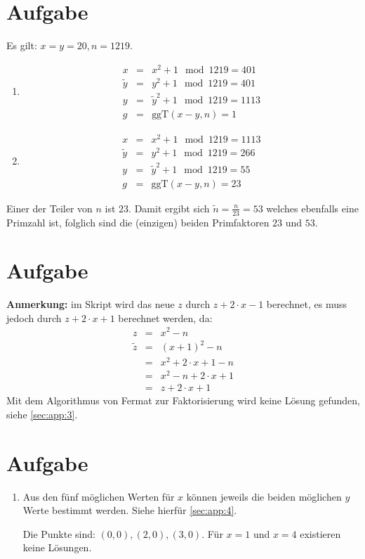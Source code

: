\documentclass[DIN, pagenumber=false, fontsize=11pt, parskip=half]{scrartcl}
\begin{document}
    \section{Aufgabe}
    Es gilt: $x = y = 20, n=1219$.
    \begin{enumerate}
        \item 
            \begin{eqnarray}
                x &=& x^2 + 1 \mod 1219 = 401 \\
                \tilde{y} &=& y^2 + 1 \mod 1219 = 401 \\
                y &=& \tilde{y}^2 + 1 \mod 1219 = 1113 \\
                g &=& \text{ggT}(x-y, n) = 1
            \end{eqnarray}
        \item 
            \begin{eqnarray}
                x &=& x^2 + 1 \mod 1219 = 1113 \\
                \tilde{y} &=& y^2 + 1 \mod 1219 = 266 \\
                y &=& \tilde{y}^2 + 1 \mod 1219 = 55 \\
                g &=& \text{ggT}(x-y, n) = 23
            \end{eqnarray}
    \end{enumerate} 
    Einer der Teiler von $n$ ist $23$. 
    Damit ergibt sich $\tilde{n} = \frac{n}{23} = 53$ welches ebenfalls eine Primzahl ist,
    folglich sind die (einzigen) beiden Primfaktoren $23$ und $53$.

    \section{Aufgabe}
    \textbf{Anmerkung:} im Skript wird das neue $z$ durch $z + 2 \cdot x - 1$ berechnet, es muss jedoch durch
    $z+ 2 \cdot x + 1$ berechnet werden, da:
    \begin{eqnarray}
        z &=& x^2 -n \\
        \tilde{z} &=& {(x+1)}^2 - n \\
        &=& x^2 + 2 \cdot x + 1 - n \\
        &=& x^2 - n + 2 \cdot x + 1 \\
        &=& z + 2 \cdot x + 1
    \end{eqnarray}
    Mit dem Algorithmus von Fermat zur Faktorisierung wird keine Lösung gefunden, siehe
    \ref{sec:app:3}.

    \section{Aufgabe}
    \begin{enumerate}[label=(\alph*)]
        \item Aus den fünf möglichen Werten für $x$ können jeweils die beiden
            möglichen $y$ Werte bestimmt werden. Siehe hierfür \ref{sec:app:4}.
            
            Die Punkte sind: $(0, 0), (2, 0), (3, 0)$. Für $x=1$ und $x=4$ existieren
            keine Lösungen.
            
    \end{enumerate}
\end{document}
